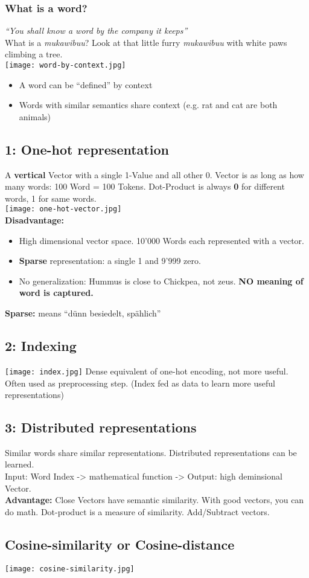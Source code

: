\subsubsection{What is a word?}
\textit{``You shall know a word by the company it keeps''}\\
What is a \textit{mukawibuu}?
Look at that little furry \textit{mukawibuu} with white paws climbing a tree.\\
\texttt{[image: word-by-context.jpg]}
\begin{itemize}
    \item A word can be ``defined'' by context
    \item Words with similar semantics share context (e.g. rat and cat are both animals)
\end{itemize}


\subsection{1: One-hot representation}
A \textbf{vertical} Vector with a single 1-Value and all other 0.
Vector is as long as how many words: 100 Word = 100 Tokens.
Dot-Product is always \textbf{0} for different words, 1 for same words.\\
\texttt{[image: one-hot-vector.jpg]}\\
\textbf{Disadvantage:}
\begin{itemize}
    \item High dimensional vector space. 10'000 Words each represented with a vector.
    \item \textbf{Sparse} representation: a single 1 and 9'999 zero.
    \item No generalization: Hummus is close to Chickpea, not zeus. \textbf{NO meaning of word is captured.}
\end{itemize}
\textbf{Sparse:} means ``dünn besiedelt, spählich''

\subsection{2: Indexing}
\texttt{[image: index.jpg]}
Dense equivalent of one-hot encoding, not more useful.
Often used as preprocessing step. (Index fed as data to learn more useful representations)

\subsection{3: Distributed representations}
Similar words share similar representations.
Distributed representations can be learned.\\
Input: Word Index -> mathematical function -> Output: high deminsional Vector.\\
\textbf{Advantage:} Close Vectors have semantic similarity.
With good vectors, you can do math.
Dot-product is a measure of similarity.
Add/Subtract vectors.

\subsection{Cosine-similarity or Cosine-distance}
\texttt{[image: cosine-similarity.jpg]}